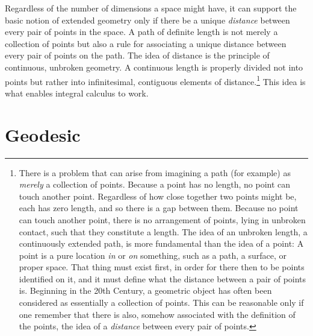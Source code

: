 Regardless of the number of dimensions a space might have, it can support the
basic notion of extended geometry only if there be a unique \emph{distance}
between every pair of points in the space.  A path of definite length is not
merely a collection of points but also a rule for associating a unique distance
between every pair of points on the path.  The idea of distance is the
principle of continuous, unbroken geometry.  A continuous length is properly
divided not into points but rather into infinitesimal, contiguous elements of
distance.\footnote{%
   There is a problem that can arise from imagining a path (for example) as
   \emph{merely} a collection of points.  Because a point has no length, no
   point can touch another point.  Regardless of how close together two points
   might be, each has zero length, and so there is a gap between them.  Because
   no point can touch another point, there is no arrangement of points, lying
   in unbroken contact, such that they constitute a length.  The idea of an
   unbroken length, a continuously extended path, is more fundamental than the
   idea of a point:  A point is a pure location \emph{in} or \emph{on}
   something, such as a path, a surface, or proper space.  That thing must
   exist first, in order for there then to be points identified on it, and it
   must define what the distance between a pair of points is.  Beginning in the
   20th Century, a geometric object has often been considered as essentially a
   collection of points.  This can be reasonable only if one remember that
   there is also, somehow associated with the definition of the points, the
   idea of a \emph{distance} between every pair of points.%
}
This idea is what enables integral calculus to work.

\section{Geodesic}


